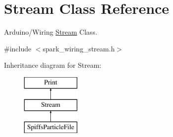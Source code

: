 \hypertarget{class_stream}{}\section{Stream Class Reference}
\label{class_stream}


Arduino/\+Wiring \mbox{\hyperlink{class_stream}{Stream}} Class.  




{\ttfamily \#include $<$spark\+\_\+wiring\+\_\+stream.\+h$>$}

Inheritance diagram for Stream\+:\begin{figure}[H]
\begin{center}
\leavevmode
\includegraphics[height=3.000000cm]{class_stream}
\end{center}
\end{figure}
